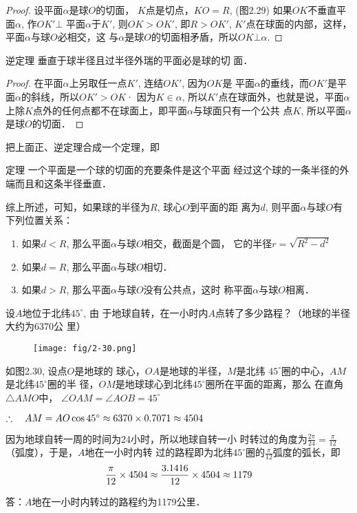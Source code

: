 \begin{proof}
    设平面$\alpha$是球$O$的切面，
    $K$点是切点，$KO=R$, (图2.29)
    如果$OK$不垂直平面$\alpha$, 作$OK'\bot$
    平面$\alpha$于$K'$, 则$OK>OK'$, 即$R>OK'$, $K'$点在球面的内部，这样，平面$\alpha$与球$O$必相交，这
与$\alpha$是球$O$的切面相矛盾，所以$OK\bot\alpha$.
\end{proof}

\begin{blk}
  {逆定理} 垂直于球半径且过半径外瑞的平面必是球的切
面．  
\end{blk}

\begin{proof}
在平面$\alpha$上另取任一点$K'$, 连结$OK'$, 因为$OK$是
平面$\alpha$的垂线，而$OK'$是平面$\alpha$的斜线，所以$OK'>OK$· 
因为$K\in\alpha$, 所以$K'$点在球面外，也就是说，平面$\alpha$上除$K$点外的任何点都不在球面上，即平面$\alpha$与球面只有一个公共
点$K$, 所以平面$\alpha$是球$O$的切面．
\end{proof}

把上面正、逆定理合成一个定理，即

\begin{blk}
    {定理} 一个平面是一个球的切面的充要条件是这个平面
经过这个球的一条半径的外端而且和这条半径垂直．
\end{blk}

综上所述，可知，如果球的半径为$R$, 球心$O$到平面的距
离为$d$, 则平面$\alpha$与球$O$有下列位置关系：
\begin{enumerate}
\item 如果$d<R$, 那么平面$\alpha$与球$O$相交，截面是个圆，
它的半径$r=\sqrt{R^2-d^2}$
\item 如果$d=R$, 那么平面$\alpha$与球$O$相切．
\item 如果$d>R$, 那么平面$\alpha$与球$O$没有公共点，这时
称平面$\alpha$与球$O$相离．
\end{enumerate}

\begin{example}
    设$A$地位于北纬$45^{\circ}$, 由
于地球自转，在一小时内$A$点转了多少路程？（地球的半径大约为6370公
里）
\end{example}

\begin{figure}[htp]
    \centering
\texttt{[image: fig/2-30.png]}
    \caption{}
\end{figure}

\begin{solution}
    如图2.30, 设点$O$是地球的
    球心，$OA$是地球的半径，$M$是北纬
    $45^{\circ}$圈的中心，$AM$是北纬$45^{\circ}$圈的半
    径，$OM$是地球球心到北纬$45^{\circ}$圈所在平面的距离，那么
在直角$\triangle AMO$中，
$\angle OAM=\angle AOB=45^{\circ}$

$\therefore\quad AM=AO\cos45^{\circ}\approx 6370\times0.7071\approx 4504$

因为地球自转一周的时间为24小时，所以地球自转一小
时转过的角度为$\frac{2\pi}{24}=\frac{\pi}{12}$（弧度），于是，$A$地在一小时内转
过的路程即为北纬$45^{\circ}$圈的$\frac{\pi}{12}$弧度的弧长，即
\[\dfrac{\pi}{12}\times 4504\approx \dfrac{3.1416}{12}\times 4504\approx 1179\]

答：$A$地在一小时内转过的路程约为1179公里．
\end{solution}

